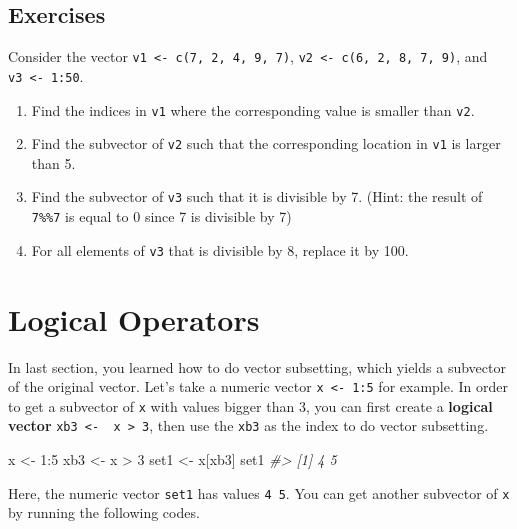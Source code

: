 \documentclass[
]{book}
\newenvironment{Shaded}{\begin{snugshade}}{\end{snugshade}}
\newcommand{\CommentTok}[1]{\textcolor[rgb]{0.56,0.35,0.01}{\textit{#1}}}
\newcommand{\DecValTok}[1]{\textcolor[rgb]{0.00,0.00,0.81}{#1}}
\newcommand{\NormalTok}[1]{#1}
\newcommand{\OtherTok}[1]{\textcolor[rgb]{0.56,0.35,0.01}{#1}}
\newcommand{\SpecialCharTok}[1]{\textcolor[rgb]{0.00,0.00,0.00}{#1}}
\begin{document}
\hypertarget{exercises-8}{%
\subsection{Exercises}\label{exercises-8}}

Consider the vector \texttt{v1\ \textless{}-\ c(7,\ 2,\ 4,\ 9,\ 7)}, \texttt{v2\ \textless{}-\ c(6,\ 2,\ 8,\ 7,\ 9)}, and \texttt{v3\ \textless{}-\ 1:50}.

\begin{enumerate}
\def\labelenumi{\arabic{enumi}.}
\item
  Find the indices in \texttt{v1} where the corresponding value is smaller than \texttt{v2}.
\item
  Find the subvector of \texttt{v2} such that the corresponding location in \texttt{v1} is larger than 5.
\item
  Find the subvector of \texttt{v3} such that it is divisible by 7. (Hint: the result of \texttt{7\%\%7} is equal to 0 since 7 is divisible by 7)
\item
  For all elements of \texttt{v3} that is divisible by 8, replace it by 100.
\end{enumerate}

\hypertarget{logical-operators}{%
\section{Logical Operators}\label{logical-operators}}

In last section, you learned how to do vector subsetting, which yields a subvector of the original vector. Let's take a numeric vector \texttt{x\ \textless{}-\ 1:5} for example. In order to get a subvector of \texttt{x} with values bigger than 3, you can first create a \textbf{logical vector} \texttt{xb3\ \textless{}-\ \ x\ \textgreater{}\ 3}, then use the \texttt{xb3} as the index to do vector subsetting.

\begin{Shaded}
\begin{Highlighting}[]
\NormalTok{x }\OtherTok{\textless{}{-}} \DecValTok{1}\SpecialCharTok{:}\DecValTok{5}
\NormalTok{xb3 }\OtherTok{\textless{}{-}}\NormalTok{ x }\SpecialCharTok{\textgreater{}} \DecValTok{3}
\NormalTok{set1 }\OtherTok{\textless{}{-}}\NormalTok{ x[xb3]}
\NormalTok{set1}
\CommentTok{\#\textgreater{} [1] 4 5}
\end{Highlighting}
\end{Shaded}

Here, the numeric vector \texttt{set1} has values \texttt{4\ 5}. You can get another subvector of \texttt{x} by running the following codes.
\end{document}

